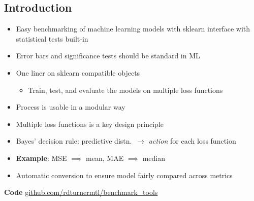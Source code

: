 \documentclass[a0,landscape]{a0poster}
\newcommand{\mysection}[1]{\section*{\fontsize{67.1}{82} \selectfont \color{NavyBlue} #1 \color{Black}}}
\begin{document}
\begin{multicols}{3} %


\Large

\mysection{Introduction}

\begin{itemize}
  \item Easy benchmarking of machine learning models with sklearn interface with statistical tests built-in
  \item Error bars and significance tests should be standard in ML
  \item One liner on sklearn compatible objects
  \begin{itemize}
    \item Train, test, and evaluate the models on multiple loss functions
  \end{itemize}
  \item Process is usable in a modular way
\end{itemize}

\begin{itemize}
  \item Multiple loss functions is a key design principle
  \item Bayes' decision rule: predictive distn.~$\rightarrow$ \emph{action} for each loss function
  \item \textbf{Example}: MSE $\implies$ mean, MAE $\implies$ median
  \item Automatic conversion to ensure model fairly compared across metrics
\end{itemize}
%
\textbf{Code}
\large {\url{github.com/rdturnermtl/benchmark_tools}}

\columnbreak


\end{multicols}
\end{document}
